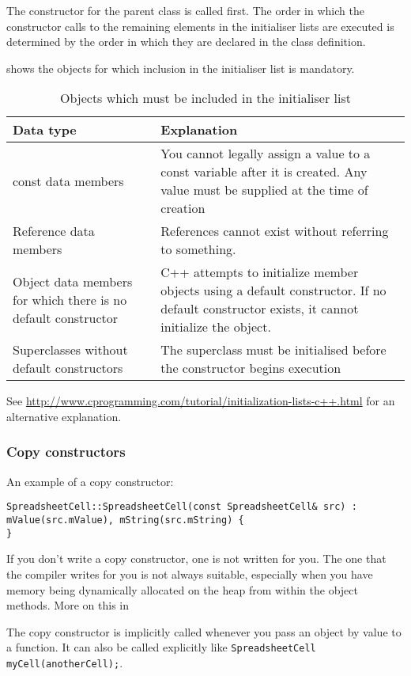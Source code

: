 \documentclass[a4paper,12pt]{article}
\begin{document}
The constructor for the parent class is called first. The order in which the constructor calls to the remaining elements in the initialiser lists are executed is determined by the order in which they are declared in the class definition.

 shows the objects for which inclusion in the initialiser list is mandatory.
\begin{table}
  \centering
  \begin{tabulary}{\textwidth}{|L|L|}
    \hline
    {\bf Data type} & {\bf Explanation} \\ \hline
    const data members & You cannot legally assign a value to a const variable after it is created. Any value must be supplied at the time of creation \\ \hline
    Reference data members & References cannot exist without referring to something. \\ \hline
    Object data members for which there is no default constructor & C++ attempts to initialize member objects using a default constructor. If no default constructor exists, it cannot initialize the object. \\ \hline
    Superclasses without default constructors & The superclass must be initialised before the constructor begins execution \\ \hline
  \end{tabulary}
  \caption{Objects which must be included in the initialiser list}
  \label{tab:initialiserMandatory}
\end{table}

See {\footnotesize\url{http://www.cprogramming.com/tutorial/initialization-lists-c++.html}} for an alternative explanation.

\subsubsection{Copy constructors}
An example of a copy constructor:
\begin{lstlisting}
SpreadsheetCell::SpreadsheetCell(const SpreadsheetCell& src) :
mValue(src.mValue), mString(src.mString) {
}
\end{lstlisting}
If you don't write a copy constructor, one is not written for you. The one that the compiler writes for you is not always suitable, especially when you have memory being dynamically allocated on the heap from within the object methods. More on this in %

The copy constructor is implicitly called whenever you pass an object by value to a function. It can also be called explicitly like \lstinline|SpreadsheetCell myCell(anotherCell);|.
\end{document}

